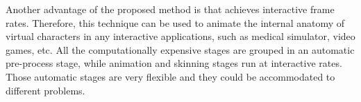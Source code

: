 




Another advantage of the proposed method is that achieves interactive frame rates. Therefore, this technique can be used to animate the internal anatomy of virtual characters in any interactive applications, such as medical simulator, video games, etc. All the computationally expensive stages are grouped in an automatic pre-process stage, while animation and skinning stages run at interactive rates.
Those automatic stages are very flexible and they could be accommodated to different problems. %

